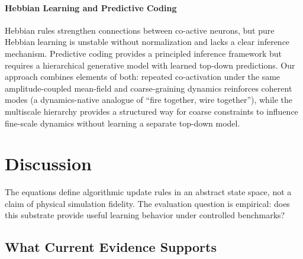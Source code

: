 \documentclass[11pt,a4paper]{article}
\begin{document}
\paragraph{Hebbian Learning and Predictive Coding}
Hebbian rules \citep{hebb1949organization} strengthen connections between co-active neurons, but pure Hebbian learning is unstable without normalization and lacks a clear inference mechanism. Predictive coding \citep{rao1999predictive, friston2010free} provides a principled inference framework but requires a hierarchical generative model with learned top-down predictions. Our approach combines elements of both: repeated co-activation under the same amplitude-coupled mean-field and coarse-graining dynamics reinforces coherent modes (a dynamics-native analogue of ``fire together, wire together''), while the multiscale hierarchy provides a structured way for coarse constraints to influence fine-scale dynamics without learning a separate top-down model.







\section{Discussion}
\label{sec:discussion}

The equations define algorithmic update rules in an abstract state space, not a claim of physical simulation fidelity. The evaluation question is empirical: does this substrate provide useful learning behavior under controlled benchmarks?

\subsection{What Current Evidence Supports}
\end{document}
